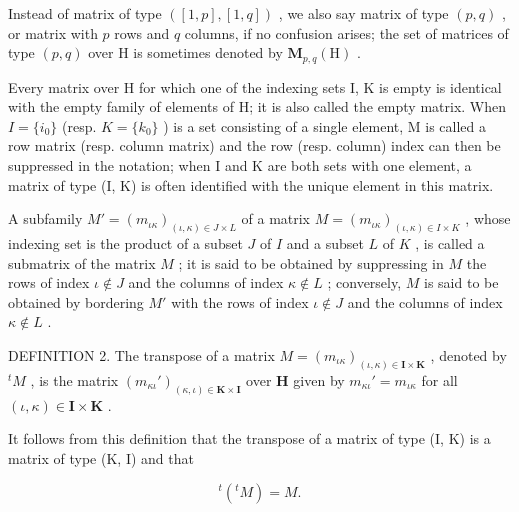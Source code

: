 Instead of matrix of type \(([1, p], [1, q])\) , we also say matrix of type \((p, q)\) , or matrix with \(p\) rows and \(q\) columns, if no confusion arises; the set of matrices of type \((p, q)\) over H is sometimes denoted by \(\mathbf{M}_{p,q}(\mathrm{H})\) .

Every matrix over H for which one of the indexing sets I, K is empty is identical with the empty family of elements of H; it is also called the empty matrix. When \(I = \{i_{0}\}\) (resp. \(K = \{k_{0}\}\) ) is a set consisting of a single element, M is called a row matrix (resp. column matrix) and the row (resp. column) index can then be suppressed in the notation; when I and K are both sets with one element, a matrix of type (I, K) is often identified with the unique element in this matrix.

A subfamily \(M' = (m_{\iota \kappa})_{(\iota, \kappa) \in J \times L}\) of a matrix \(M = (m_{\iota \kappa})_{(\iota, \kappa) \in I \times K}\) , whose indexing set is the product of a subset \(J\) of \(I\) and a subset \(L\) of \(K\) , is called a submatrix of the matrix \(M\) ; it is said to be obtained by suppressing in \(M\) the rows of index \(\iota \notin J\) and the columns of index \(\kappa \notin L\) ; conversely, \(M\) is said to be obtained by bordering \(M'\) with the rows of index \(\iota \notin J\) and the columns of index \(\kappa \notin L\) .

DEFINITION 2. The transpose of a matrix \(M = (m_{\iota \kappa})_{(\iota, \kappa) \in \mathbf{I} \times \mathbf{K}}\) , denoted by \({}^tM\) , is the matrix \((m_{\kappa \iota}')_{(\kappa, \iota) \in \mathbf{K} \times \mathbf{I}}\) over \(\mathbf{H}\) given by \(m_{\kappa \iota}' = m_{\iota \kappa}\) for all \((\iota, \kappa) \in \mathbf{I} \times \mathbf{K}\) .

It follows from this definition that the transpose of a matrix of type (I, K) is a matrix of type (K, I) and that

\[
{ } ^ { t } ( { } ^ { t } M ) = M .\tag{1}
\]

